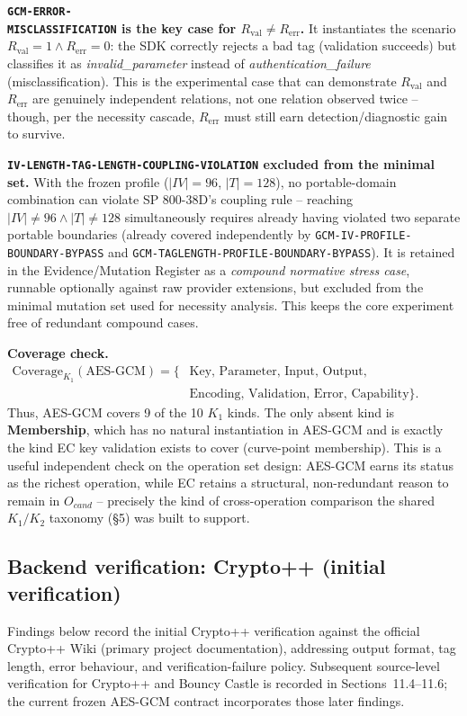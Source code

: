 \documentclass[11pt,a4paper]{article}
\begin{document}
\textbf{\texttt{GCM-ERROR-}\\
\texttt{MISCLASSIFICATION} is the key case for $R_{\text{val}} \neq R_{\text{err}}$.} It instantiates the scenario $R_{\text{val}}=1 \land R_{\text{err}}=0$: the SDK correctly rejects a bad tag (validation succeeds) but classifies it as \emph{invalid\_parameter} instead of \emph{authentication\_failure} (misclassification). This is the experimental case that can demonstrate $R_{\text{val}}$ and $R_{\text{err}}$ are genuinely independent relations, not one relation observed twice -- though, per the necessity cascade, $R_{\text{err}}$ must still earn detection/diagnostic gain to survive.

\textbf{\texttt{IV-LENGTH-TAG-LENGTH-COUPLING-VIOLATION} excluded from the minimal set.} With the frozen profile ($|IV|=96$, $|T|=128$), no portable-domain combination can violate SP 800-38D's coupling rule -- reaching $|IV|\neq96 \land |T|\neq128$ simultaneously requires already having violated two separate portable boundaries (already covered independently by \texttt{GCM-IV-PROFILE-BOUNDARY-BYPASS} and \texttt{GCM-TAGLENGTH-PROFILE-BOUNDARY-BYPASS}). It is retained in the Evidence/Mutation Register as a \emph{compound normative stress case}, runnable optionally against raw provider extensions, but excluded from the minimal mutation set used for necessity analysis. This keeps the core experiment free of redundant compound cases.

\textbf{Coverage check.}
\[
\begin{aligned}
\text{Coverage}_{K_1}(\text{AES-GCM})=\{&
\text{Key, Parameter, Input, Output, Authentication,}\\
&
\text{Encoding, Validation, Error, Capability}\}.
\end{aligned}
\]
Thus, AES-GCM covers 9 of the 10 $K_1$ kinds. The only absent kind is \textbf{Membership}, which has no natural instantiation in AES-GCM and is exactly the kind EC key validation exists to cover (curve-point membership). This is a useful independent check on the operation set design: AES-GCM earns its status as the richest operation, while EC retains a structural, non-redundant reason to remain in $O_{cand}$ -- precisely the kind of cross-operation comparison the shared $K_1/K_2$ taxonomy (\S5) was built to support.



\subsection{Backend verification: Crypto++ (initial verification)}\label{sec:aesgcm-backends}
Findings below record the initial Crypto++ verification against the official Crypto++ Wiki
(primary project documentation), addressing output format, tag length, error behaviour, and
verification-failure policy. Subsequent source-level verification for Crypto++ and Bouncy Castle
is recorded in Sections~11.4--11.6; the current frozen AES-GCM contract incorporates those later
findings.
\end{document}
